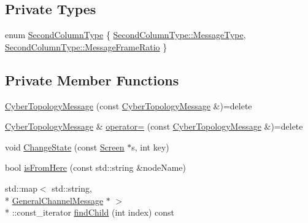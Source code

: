 \subsection*{Private Types}
\begin{DoxyCompactItemize}
\item 
enum \hyperlink{classCyberTopologyMessage_a19a78ae56d2bd909e1b1403b3db83c52}{Second\-Column\-Type} \{ \hyperlink{classCyberTopologyMessage_a19a78ae56d2bd909e1b1403b3db83c52a20b67ff6d86442b20819a3cd48bfc603}{Second\-Column\-Type\-::\-Message\-Type}, 
\hyperlink{classCyberTopologyMessage_a19a78ae56d2bd909e1b1403b3db83c52ace684cd329278d8b9193d22926686db5}{Second\-Column\-Type\-::\-Message\-Frame\-Ratio}
 \}
\end{DoxyCompactItemize}
\subsection*{Private Member Functions}
\begin{DoxyCompactItemize}
\item 
\hyperlink{classCyberTopologyMessage_acd5200e9387d9d989177b64deb426b17}{Cyber\-Topology\-Message} (const \hyperlink{classCyberTopologyMessage}{Cyber\-Topology\-Message} \&)=delete
\item 
\hyperlink{classCyberTopologyMessage}{Cyber\-Topology\-Message} \& \hyperlink{classCyberTopologyMessage_a9783107b7c5254325ecf6d6f59a22d4e}{operator=} (const \hyperlink{classCyberTopologyMessage}{Cyber\-Topology\-Message} \&)=delete
\item 
void \hyperlink{classCyberTopologyMessage_a4a61d42621d8db354727a18e9495a190}{Change\-State} (const \hyperlink{classScreen}{Screen} $\ast$s, int key)
\item 
bool \hyperlink{classCyberTopologyMessage_a2c775a5c10fce9c33f5316f877c9f018}{is\-From\-Here} (const std\-::string \&node\-Name)
\item 
std\-::map$<$ std\-::string, \\*
\hyperlink{classGeneralChannelMessage}{General\-Channel\-Message} $\ast$ $>$\\*
\-::const\-\_\-iterator \hyperlink{classCyberTopologyMessage_ade141cee6b72beee0a1255292bfa5124}{find\-Child} (int index) const 
\end{DoxyCompactItemize}
